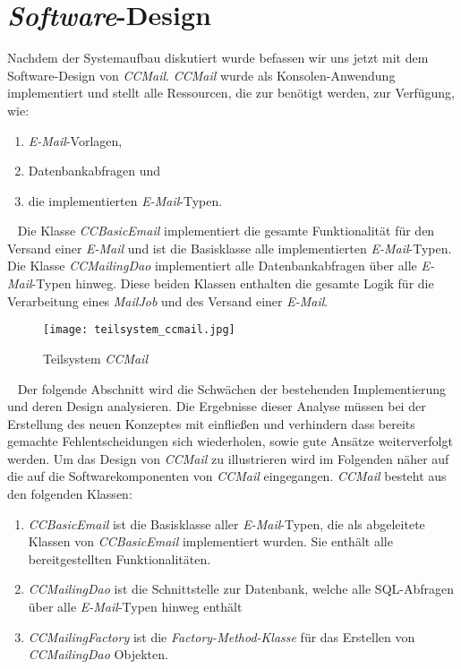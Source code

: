 \section{\emph{Software}-Design}
\label{sec:ccmail-software-design}
Nachdem der Systemaufbau diskutiert wurde befassen wir uns jetzt mit dem Software-Design von \emph{CCMail}. \emph{CCMail} wurde als Konsolen-Anwendung implementiert und stellt alle Ressourcen, die zur benötigt werden, zur Verfügung, wie:
\begin{enumerate}
	\item \emph{E-Mail}-Vorlagen,
	\item Datenbankabfragen und
	\item die implementierten \emph{E-Mail}-Typen.
\end{enumerate}
\ \newline
Die Klasse \emph{CCBasicEmail} implementiert die gesamte Funktionalität für den Versand einer \emph{E-Mail} und ist die Basisklasse alle implementierten \emph{E-Mail}-Typen. Die Klasse \emph{CCMailingDao} implementiert alle Datenbankabfragen über alle \emph{E-Mail}-Typen hinweg. Diese beiden Klassen enthalten die gesamte Logik für die Verarbeitung eines \emph{MailJob} und des Versand einer \emph{E-Mail}.
\begin{figure}[h]
\centering
\texttt{[image: teilsystem\_ccmail.jpg]} 
\caption{Teilsystem \emph{CCMail}}
\label{fig:ccmail-teilsystem}
\end{figure}
\ \newline
Der folgende Abschnitt wird die Schwächen der bestehenden Implementierung und deren Design analysieren. Die Ergebnisse dieser Analyse müssen bei der Erstellung des neuen Konzeptes mit einfließen und verhindern dass bereits gemachte Fehlentscheidungen sich wiederholen, sowie gute Ansätze weiterverfolgt werden.
\newline
\newline
Um das Design von \emph{CCMail} zu illustrieren wird im Folgenden näher auf die auf die Softwarekomponenten von \emph{CCMail} eingegangen. \emph{CCMail} besteht aus den folgenden Klassen:
\begin{enumerate}
	\item\emph{CCBasicEmail} ist die Basisklasse aller \emph{E-Mail}-Typen, die als abgeleitete Klassen von \emph{CCBasicEmail} implementiert wurden. Sie enthält alle bereitgestellten Funktionalitäten.
	\item\emph{CCMailingDao} ist die Schnittstelle zur Datenbank, welche alle SQL-Abfragen über alle \emph{E-Mail}-Typen hinweg enthält
	\item\emph{CCMailingFactory} ist die \emph{Factory-Method-Klasse} für das Erstellen von \emph{CCMailingDao} Objekten.
\end{enumerate}
\newpage

